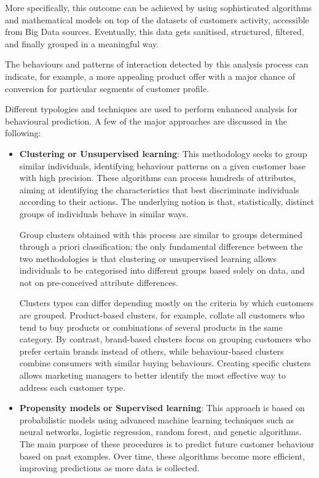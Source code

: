 \pagebreak

More specifically, this outcome can be achieved by using sophisticated algorithms and mathematical models on top of the datasets of customers activity, accessible from Big Data sources. Eventually, this data gets sanitised, structured, filtered, and finally grouped in a meaningful way. 

The behaviours and patterns of interaction detected by this analysis process can indicate, for example, a more appealing product offer with a major chance of conversion for particular segments of customer profile.

Different typologies and techniques are used to perform enhanced analysis for behavioural prediction. A few of the major approaches are discussed in the following:

\begin{itemize}
    \item \textbf{Clustering or Unsupervised learning}: This methodology seeks to group similar individuals, identifying behaviour patterns on a given customer base with high precision. These algorithms can process hundreds of attributes, aiming at identifying the characteristics that best discriminate individuals according to their actions. The underlying notion is that, statistically, distinct groups of individuals behave in similar ways. 
    
    Group clusters obtained with this process are similar to groups determined through a priori classification; the only fundamental difference between the two methodologies is that clustering or unsupervised learning allows individuals to be categorised into different groups based solely on data, and not on pre-conceived attribute differences. 
    
    Clusters types can differ depending mostly on the criteria by which customers are grouped. Product-based clusters, for example, collate all customers who tend to buy products or combinations of several products in the same category. By contrast, brand-based clusters focus on grouping customers who prefer certain brands instead of others, while behaviour-based clusters combine consumers with similar buying behaviours. Creating specific clusters allows marketing managers to better identify the most effective way to address each customer type.

    \item \textbf{Propensity models or Supervised learning}: This approach is based on probabilistic models using advanced machine learning techniques such as neural networks, logistic regression, random forest, and genetic algorithms. The main purpose of these procedures is to predict future customer behaviour based on past examples. Over time, these algorithms become more efficient, improving predictions as more data is collected.


\end{itemize}
